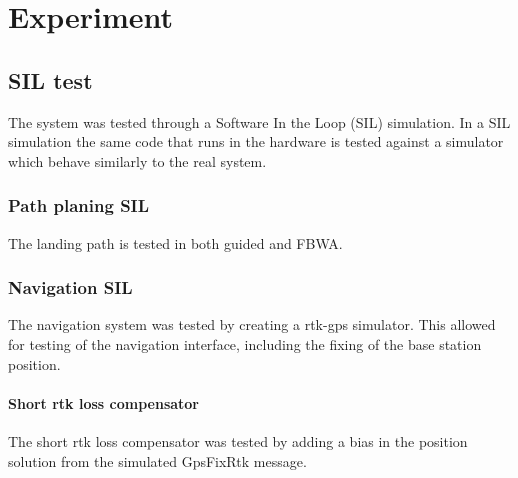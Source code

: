 \part{Experiment}

\chapter{SIL test}
The system was tested through a Software In the Loop (SIL) simulation. In a SIL simulation the same code that runs in the hardware is tested against a simulator which behave similarly to the real system.

\section{Path planing SIL}
The landing path is tested in both guided and FBWA. 
\section{Navigation SIL}
The navigation system was tested by creating a \gls{rtk-gps} simulator. This allowed for testing of the navigation interface, including the fixing of the base station position.

\subsection{Short rtk loss compensator}
The short rtk loss compensator was tested by adding a bias in the position solution from the simulated GpsFixRtk message. 
